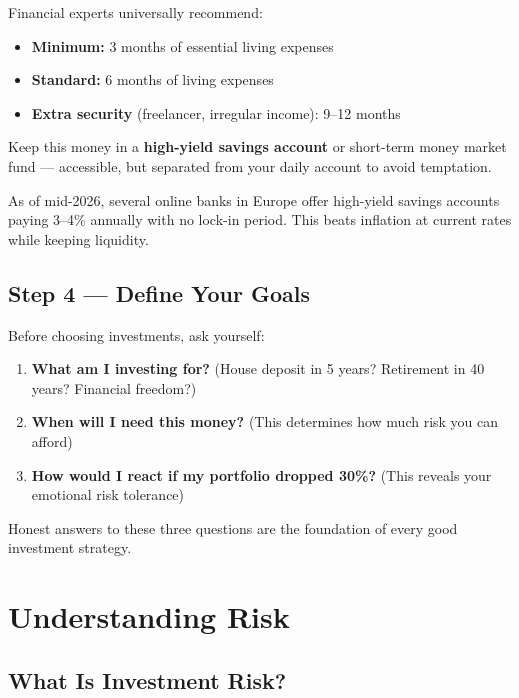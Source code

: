 \documentclass[12pt, a4paper]{book}
\begin{document}
Financial experts universally recommend:

\begin{itemize}[leftmargin=1.5cm]
  \item \textbf{Minimum:} 3 months of essential living expenses
  \item \textbf{Standard:} 6 months of living expenses
  \item \textbf{Extra security} (freelancer, irregular income): 9--12 months
\end{itemize}

Keep this money in a \textbf{high-yield savings account} or short-term money market fund --- accessible, but separated from your daily account to avoid temptation.

\begin{tipbox}
As of mid-2026, several online banks in Europe offer high-yield savings accounts paying 3--4\% annually with no lock-in period. This beats inflation at current rates while keeping liquidity.
\end{tipbox}

\section{Step 4 --- Define Your Goals}

Before choosing investments, ask yourself:
\begin{enumerate}[leftmargin=1.5cm]
  \item \textbf{What am I investing for?} (House deposit in 5 years? Retirement in 40 years? Financial freedom?)
  \item \textbf{When will I need this money?} (This determines how much risk you can afford)
  \item \textbf{How would I react if my portfolio dropped 30\%?} (This reveals your emotional risk tolerance)
\end{enumerate}

Honest answers to these three questions are the foundation of every good investment strategy.

\chapter{Understanding Risk}

\section{What Is Investment Risk?}
\end{document}
